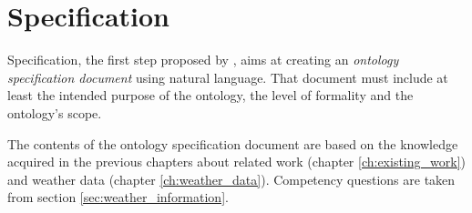 \section{Specification}
\label{sec:ontology_specification}

Specification, the first step proposed by \methontology, aims at creating an \emph{ontology specification document} using natural language. That document must include at least the intended purpose of the ontology, the level of 
formality and the ontology's scope.

The contents of the ontology specification document are based on the knowledge acquired in the previous chapters about related work (chapter \ref{ch:existing_work}) and weather data (chapter \ref{ch:weather_data}). Competency questions are taken from section \ref{sec:weather_information}.


